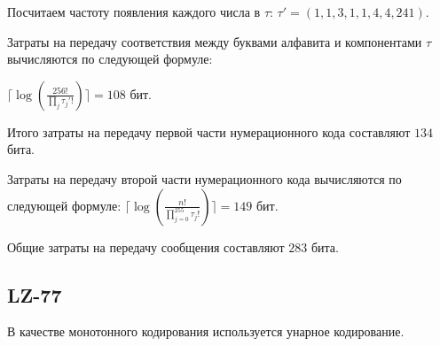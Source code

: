 Посчитаем частоту появления каждого числа в $\tau$: $\tau' = (1, 1, 3, 1, 1, 4, 4, 241)$.

Затраты на передачу соответствия между буквами алфавита и компонентами $\tau$ вычисляются
по следующей формуле:

$\lceil\log(\frac{256!}{\prod\limits_{j}\tau_j'!})\rceil = 108$ бит.

Итого затраты на передачу первой части нумерационного кода составляют $134$ бита.

Затраты на передачу второй части нумерационного кода вычисляются по следующей формуле:
$\lceil\log(\frac{n!}{\prod\nolimits_{j=0}^{255}\tau_j!})\rceil = 149$ бит.

Общие затраты на передачу сообщения составляют $283$ бита.

\subsection{LZ-77}

В качестве монотонного кодирования используется унарное кодирование.

